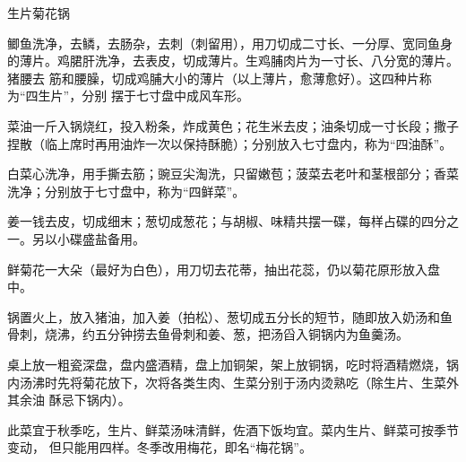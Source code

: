 \begin{recipe}{生片菊花锅}

\ingredients


\preparation

\step 鲫鱼洗净，去鳞，去肠杂，去刺（刺留用），用刀切成二寸长、一分厚、宽同鱼身
的薄片。鸡𬂁肝洗净，去表皮，切成薄片。生鸡脯肉片为一寸长、八分宽的薄片。猪腰去
筋和腰臊，切成鸡脯大小的薄片（以上薄片，愈薄愈好）。这四种片称为“四生片”，分别
摆于七寸盘中成风车形。

\step 菜油一斤入锅烧红，投入粉条，炸成黄色；花生米去皮；油条切成一寸长段；撒子
捏散（临上席时再用油炸一次以保持酥脆）；分别放入七寸盘内，称为“四油酥”。

\step 白菜心洗净，用手撕去筋；豌豆尖淘洗，只留嫩苞；菠菜去老叶和茎根部分；香菜
洗净；分别放于七寸盘中，称为“四鲜菜”。

\step 姜一钱去皮，切成细末；葱切成葱花；与胡椒、味精共摆一碟，每样占碟的四分之
一。另以小碟盛盐备用。

\step 鲜菊花一大朵（最好为白色），用刀切去花蒂，抽出花蕊，仍以菊花原形放入盘
中。

\step 锅置火上，放入猪油，加入姜（拍松）、葱切成五分长的短节，随即放入奶汤和鱼
骨刺，烧沸，约五分钟捞去鱼骨刺和姜、葱，把汤舀入铜锅内为鱼羹汤。

\step 桌上放一粗瓷深盘，盘内盛酒精，盘上加铜架，架上放铜锅，吃时将酒精燃烧，锅
内汤沸时先将菊花放下，次将各类生肉、生菜分别于汤内烫熟吃（除生片、生菜外其余油
酥忌下锅内）。

\features

此菜宜于秋季吃，生片、鲜菜汤味清鲜，佐酒下饭均宜。菜内生片、鲜菜可按季节变动，
但只能用四样。冬季改用梅花，即名“梅花锅”。

\end{recipe}

